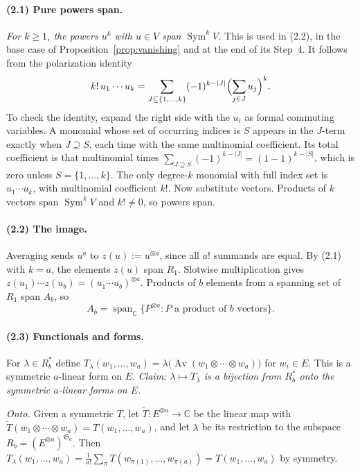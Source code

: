 \documentclass[11pt]{article}
\theoremstyle{remark}
\DeclareMathOperator{\Sym}{Sym}
\DeclareMathOperator{\Av}{Av}
\newcommand{\C}{\mathbb C}
\newcommand{\Sa}{\mathfrak S_a}
\begin{document}
\paragraph{(2.1) Pure powers span.}
\emph{For $k\ge1$, the powers $u^k$ with $u\in V$ span $\Sym^kV$.} This is
used in (2.2), in the base case of Proposition~\ref{prop:vanishing} and at
the end of its Step~4. It follows from the polarization identity
\[
 k!\,u_1\cdots u_k
 =\sum_{J\subseteq\{1,\ldots,k\}}(-1)^{k-|J|}
   \Bigl(\sum_{j\in J}u_j\Bigr)^k .
\]
To check the identity, expand the right side with the $u_i$ as formal
commuting variables. A monomial whose set of occurring indices is $S$
appears in the $J$-term exactly when $J\supseteq S$, each time with the same
multinomial coefficient. Its total coefficient is that multinomial times
$\sum_{J\supseteq S}(-1)^{k-|J|}=(1-1)^{k-|S|}$, which is zero unless
$S=\{1,\ldots,k\}$. The only degree-$k$ monomial with full index set is
$u_1\cdots u_k$, with multinomial coefficient $k!$. Now substitute vectors.
Products of $k$ vectors span $\Sym^kV$ and $k!\ne0$, so powers span.

\paragraph{(2.2) The image.}
Averaging sends $u^a$ to $z(u):=u^{\otimes a}$, since all $a!$ summands are
equal. By (2.1) with $k=a$, the elements $z(u)$ span $R_1$. Slotwise
multiplication gives
$z(u_1)\cdots z(u_b)=(u_1\cdots u_b)^{\otimes a}$. Products of $b$
elements from a spanning set of $R_1$ span $A_b$, so
\[
 A_b=\operatorname{span}_{\C}
 \{P^{\otimes a}: P\text{ a product of }b\text{ vectors}\}.
\]

\paragraph{(2.3) Functionals and forms.}
For $\lambda\in R_b^*$ define
$T_\lambda(w_1,\ldots,w_a)
 =\lambda\bigl(\Av(w_1\otimes\cdots\otimes w_a)\bigr)$ for $w_i\in E$.
This is a symmetric $a$-linear form on $E$. \emph{Claim:
$\lambda\mapsto T_\lambda$ is a bijection from $R_b^*$ onto the symmetric
$a$-linear forms on $E$.}

\emph{Onto.} Given a symmetric $T$, let $\tilde T:E^{\otimes a}\to\C$ be the
linear map with $\tilde T(w_1\otimes\cdots\otimes w_a)=T(w_1,\ldots,w_a)$,
and let $\lambda$ be its restriction to the subspace
$R_b=(E^{\otimes a})^{\Sa}$. Then
$T_\lambda(w_1,\ldots,w_a)=\frac1{a!}\sum_\pi
T(w_{\pi(1)},\ldots,w_{\pi(a)})=T(w_1,\ldots,w_a)$ by symmetry.
\end{document}
